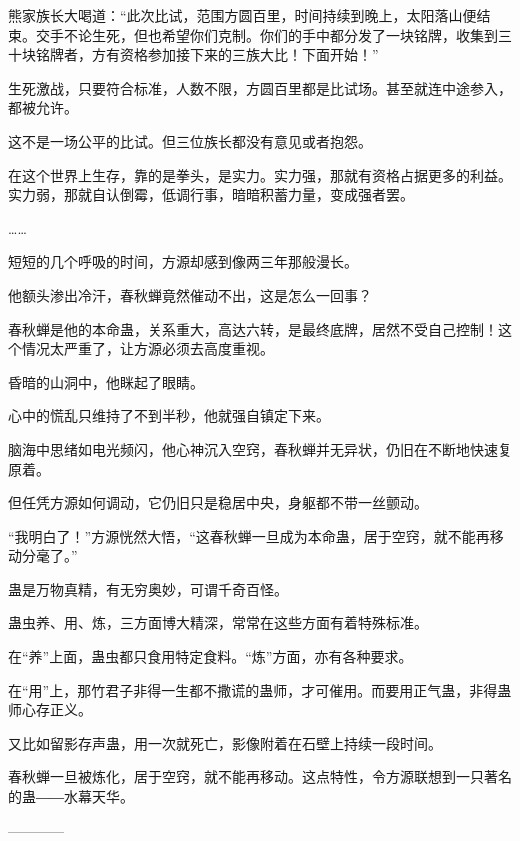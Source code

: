 \begin{this_body}
熊家族长大喝道：“此次比试，范围方圆百里，时间持续到晚上，太阳落山便结束。交手不论生死，但也希望你们克制。你们的手中都分发了一块铭牌，收集到三十块铭牌者，方有资格参加接下来的三族大比！下面开始！”

生死激战，只要符合标准，人数不限，方圆百里都是比试场。甚至就连中途参入，都被允许。

这不是一场公平的比试。但三位族长都没有意见或者抱怨。

在这个世界上生存，靠的是拳头，是实力。实力强，那就有资格占据更多的利益。实力弱，那就自认倒霉，低调行事，暗暗积蓄力量，变成强者罢。

……

短短的几个呼吸的时间，方源却感到像两三年那般漫长。

他额头渗出冷汗，春秋蝉竟然催动不出，这是怎么一回事？

春秋蝉是他的本命蛊，关系重大，高达六转，是最终底牌，居然不受自己控制！这个情况太严重了，让方源必须去高度重视。

昏暗的山洞中，他眯起了眼睛。

心中的慌乱只维持了不到半秒，他就强自镇定下来。

脑海中思绪如电光频闪，他心神沉入空窍，春秋蝉并无异状，仍旧在不断地快速复原着。

但任凭方源如何调动，它仍旧只是稳居中央，身躯都不带一丝颤动。

“我明白了！”方源恍然大悟，“这春秋蝉一旦成为本命蛊，居于空窍，就不能再移动分毫了。”

蛊是万物真精，有无穷奥妙，可谓千奇百怪。

蛊虫养、用、炼，三方面博大精深，常常在这些方面有着特殊标准。

在“养”上面，蛊虫都只食用特定食料。“炼”方面，亦有各种要求。

在“用”上，那竹君子非得一生都不撒谎的蛊师，才可催用。而要用正气蛊，非得蛊师心存正义。

又比如留影存声蛊，用一次就死亡，影像附着在石壁上持续一段时间。

春秋蝉一旦被炼化，居于空窍，就不能再移动。这点特性，令方源联想到一只著名的蛊――水幕天华。

------------

\end{this_body}

